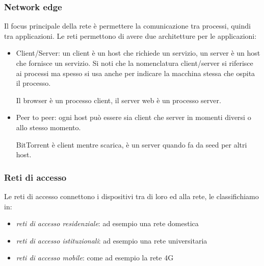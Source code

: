 \subsubsection{Network edge}
Il focus principale della rete è permettere la comunicazione tra processi, quindi tra applicazioni. Le reti permettono di avere due architetture per le applicazioni:
\begin{itemize}
    \item Client/Server: un client è un host che richiede un servizio, un server è un host che fornisce un servizio. Si noti che la nomenclatura client/server si riferisce ai processi ma spesso si usa anche per indicare la macchina stessa che ospita il processo.
    
    Il browser è un processo client, il server web è un processo server.
    
    \item Peer to peer: ogni host può essere sia client che server in momenti diversi o allo stesso momento.
    
    BitTorrent è client mentre scarica, è un server quando fa da seed per altri host.
\end{itemize}


\subsubsection{Reti di accesso}
Le reti di accesso connettono i dispositivi tra di loro ed alla rete, le classifichiamo in:
\begin{itemize}
    \item \emph{reti di accesso residenziale}: ad esempio una rete domestica
    \item \emph{reti di accesso istituzionali}: ad esempio una rete universitaria
    \item \emph{reti di accesso mobile}: come ad esempio la rete 4G
\end{itemize}


